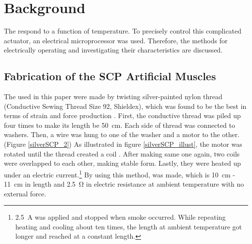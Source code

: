 \section{Background} \label{section_background}

The \scps respond to a function of temperature. To precisely control this complicated actuator, an electrical microprocessor was used. Therefore, the methods for electrically operating \scps and investigating their characteristics are discussed.

\subsection{Fabrication of the SCP Artificial Muscles}
The \scps used in this paper were made by twisting silver-painted nylon thread (Conductive Sewing Thread Size 92, Shieldex), which was found to be the best in terms of strain and force production \cite{haines}. First, the conductive thread was piled up four times to make its length be \SI{50}{\centi\meter}. Each side of thread was connected to washers. Then, a wire was hung to one of the washer and a motor to the other. (Figure \ref{silverSCP_2})
As illustrated in figure \ref{silverSCP_illust}, the motor was rotated until the thread created a coil \cite{fab_coil}. After making same one again, two coils were overlapped to each other, making stable form. 
Lastly, they were heated up under an electric current.\footnote{\SI{2.5}{\ampere} was applied and stopped when smoke occurred. While repeating heating and cooling about ten times, the length at ambient temperature got longer and reached at a constant length.} By using this method, \scp was made, which is \SI{10}{\centi\meter} - \SI{11}{\centi\meter} in length and \SI{2.5}{\ohm} in electric resistance at ambient temperature with no external force.

